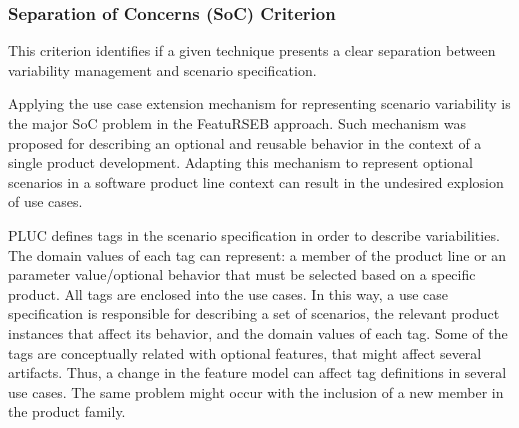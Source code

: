 \documentclass{acm_proc_article-sp}
\begin{document}


\subsubsection{Separation of Concerns (SoC) Criterion}
This criterion identifies if a given technique presents a clear
separation between variability management and scenario 
specification.

Applying the use case extension mechanism for representing scenario
variability is the major SoC problem in the FeatuRSEB approach. Such
mechanism was proposed for describing an optional and reusable behavior in
the context of a single product development. Adapting this mechanism to represent
optional scenarios in a software product line context can result in the undesired
explosion of use cases.

PLUC defines tags in the scenario specification in order to describe
variabilities. The domain values of each tag can represent: a member
of the product line or an parameter value/optional behavior that
must be selected based on a specific product. All tags are enclosed
into the use cases. In this way, a use case specification is
responsible for describing a set of scenarios, the relevant product
instances that affect its behavior, and the domain values of each
tag. Some of the tags are conceptually related with optional
features, that might affect several artifacts. Thus, a change in the
feature model can affect tag definitions in several use cases. The
same problem might occur with the inclusion of a new member in the
product family.
\end{document}
